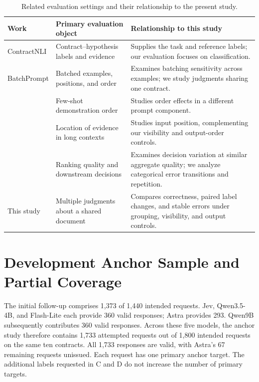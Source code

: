 \documentclass{article}
\begin{document}
\begin{table}[t]
\small
\centering
\begin{tabularx}{\textwidth}{p{}XX}
\toprule
\rowcolor{tableHeader}
Work & Primary evaluation object & Relationship to this study \\
\midrule
ContractNLI \citep{koreeda2021contractnli} & Contract--hypothesis labels and evidence & Supplies the task and reference labels; our evaluation focuses on classification. \\
BatchPrompt \citep{lin2024batchprompt} & Batched examples, positions, and order & Examines batching sensitivity across examples; we study judgments sharing one contract. \\
\citet{lu2022fantastically} & Few-shot demonstration order & Studies order effects in a different prompt component. \\
\citet{liu2024lost} & Location of evidence in long contexts & Studies input position, complementing our visibility and output-order controls. \\
\citet{frohmann2026equal} & Ranking quality and downstream decisions & Examines decision variation at similar aggregate quality; we analyze categorical error transitions and repetition. \\
This study & Multiple judgments about a shared document & Compares correctness, paired label changes, and stable errors under grouping, visibility, and output controls. \\
\bottomrule
\end{tabularx}
\caption{Related evaluation settings and their relationship to the present study.}
\label{tab:related}
\end{table}

\section{Development Anchor Sample and Partial Coverage}
The initial follow-up comprises 1,373 of 1,440 intended requests. Jev, Qwen3.5-4B, and Flash-Lite each provide 360 valid responses; Astra provides 293. Qwen9B subsequently contributes 360 valid responses. Across these five models, the anchor study therefore contains 1,733 attempted requests out of 1,800 intended requests on the same ten contracts. All 1,733 responses are valid, with Astra's 67 remaining requests unissued. Each request has one primary anchor target. The additional labels requested in C and D do not increase the number of primary targets.
\end{document}

